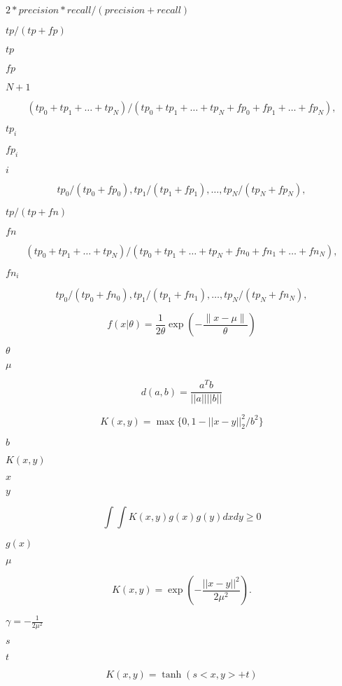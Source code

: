 \documentclass{article}
\begin{document}
$ 2 * precision * recall / (precision + recall) $
\pagebreak

$ tp / (tp + fp) $
\pagebreak

$ tp $
\pagebreak

$ fp $
\pagebreak

$ N + 1 $
\pagebreak

\[ (tp_0 + tp_1 + \ldots + tp_N) / (tp_0 + tp_1 + \ldots + tp_N + fp_0 + fp_1 + \ldots + fp_N), \]
\pagebreak

$ tp_i $
\pagebreak

$ fp_i $
\pagebreak

$ i $
\pagebreak

\[ tp_0 / (tp_0 + fp_0), tp_1 / (tp_1 + fp_1), \ldots, tp_N / (tp_N + fp_N), \]
\pagebreak

$ tp / (tp + fn) $
\pagebreak

$ fn $
\pagebreak

\[ (tp_0 + tp_1 + \ldots + tp_N) / (tp_0 + tp_1 + \ldots + tp_N + fn_0 + fn_1 + \ldots + fn_N), \]
\pagebreak

$ fn_i $
\pagebreak

\[ tp_0 / (tp_0 + fn_0), tp_1 / (tp_1 + fn_1), \ldots, tp_N / (tp_N + fn_N), \]
\pagebreak

\[ f(x|\theta) = \frac{1}{2 \theta}\exp\left(-\frac{\|x - \mu\|}{\theta}\right) \]
\pagebreak

$\theta$
\pagebreak

$\mu$
\pagebreak

\[ d(a, b) = \frac{a^T b}{|| a || || b ||} \]
\pagebreak

\[ K(x, y) = \max \{0, 1 - || x - y ||^2_2 / b^2 \} \]
\pagebreak

$ b $
\pagebreak

$ K(x, y) $
\pagebreak

$ x $
\pagebreak

$ y $
\pagebreak

\[ \int \int K(x, y) g(x) g(y) dx dy \ge 0 \]
\pagebreak

$ g(x) $
\pagebreak

$ \mu $
\pagebreak

\[ K(x, y) = \exp(-\frac{|| x - y ||^2}{2 \mu^2}). \]
\pagebreak

$ \gamma = -\frac{1}{2 \mu^2} $
\pagebreak

$ s $
\pagebreak

$ t $
\pagebreak

\[ K(x, y) = \tanh(s <x, y> + t) \]
\pagebreak
\end{document}
